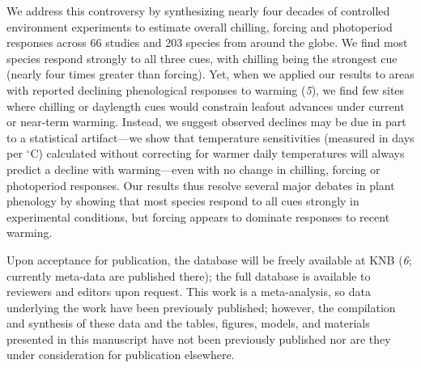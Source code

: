 \documentclass[11pt,a4paper]{letter}
\begin{document}
\begin{letter}{}
\par We address this controversy by synthesizing nearly four decades of controlled environment experiments to estimate overall chilling, forcing and photoperiod responses across 66 studies and 203 species from around the globe. We find most species respond strongly to all three cues, with chilling being the strongest cue (nearly four times greater than forcing). Yet, when we applied our results to areas with reported declining phenological responses to warming (\emph{5}), we find few sites where chilling or daylength cues would constrain leafout advances under current or near-term warming. Instead, we suggest observed declines may be due in part to a statistical artifact---we show that temperature sensitivities (measured in days per $^{\circ}$C) calculated without correcting for warmer daily temperatures will always predict a decline with warming---even with no change in chilling, forcing or photoperiod responses. %
Our results thus resolve several major debates in plant phenology by showing that most species respond to all cues strongly in experimental conditions, but forcing appears to dominate responses to recent warming. %

\par Upon acceptance for publication, the database will be freely available at KNB (\emph{6}; currently meta-data are published there); the full database is available to reviewers and editors upon request. This work is a meta-analysis, so data underlying the work have been previously published; however, the compilation and synthesis of these data and the tables, figures, models, and materials presented in this manuscript have not been previously published nor are they under consideration for publication elsewhere.


\end{letter}
\end{document}
